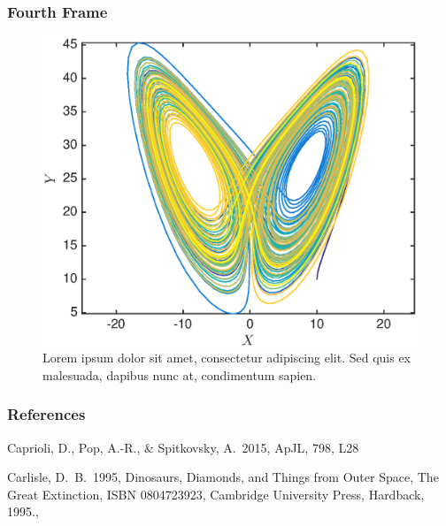 \documentclass{beamer}
\begin{document}
\begin{frame}
\frametitle{Fourth Frame}
\begin{figure}
\includegraphics[width=\textwidth]{butterfly.eps}
\caption{Lorem ipsum dolor sit amet, consectetur adipiscing elit. Sed quis ex malesuada, dapibus nunc at, condimentum sapien. }
\end{figure}

\end{frame}

\begin{frame}
\frametitle{References}   

\begin{thebibliography}{}
 Caprioli, D., Pop, A.-R., \& Spitkovsky, A.\ 2015, ApJL, 798, L28

 Carlisle, D.~B.\ 1995, 
Dinosaurs, Diamonds, and Things from Outer Space, The Great Extinction, 
ISBN 0804723923, Cambridge University Press, Hardback, 1995.,  
\end{thebibliography}

\end{frame}
\end{document}
